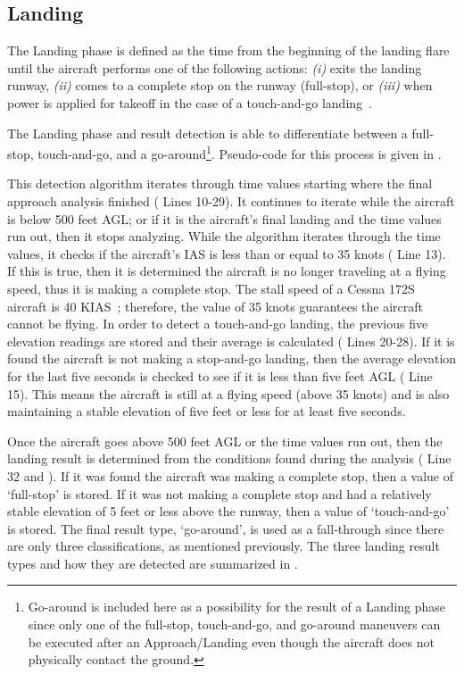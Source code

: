         
    
    \subsection{Landing}
    
    The Landing phase is defined as the time from the beginning of the landing flare until the aircraft performs one of the following actions: \textit{(i)} exits the landing runway, \textit{(ii)} comes to a complete stop on the runway (full-stop), or \textit{(iii)} when power is applied for takeoff in the case of a touch-and-go landing~\cite{cictt2013phase}.
    
    The Landing phase and result detection is able to differentiate between a full-stop, touch-and-go, and a go-around\footnote{Go-around is included here as a possibility for the result of a Landing phase since only one of the full-stop, touch-and-go, and go-around maneuvers can be executed after an Approach/Landing even though the aircraft does not physically contact the ground.}.  Pseudo-code for this process is given in .
    
    This detection algorithm iterates through time values starting where the final approach analysis finished ( Lines 10-29).  It continues to iterate while the aircraft is below 500 feet AGL; or if it is the aircraft's final landing and the time values run out, then it stops analyzing.  While the algorithm iterates through the time values, it checks if the aircraft's IAS is less than or equal to 35 knots ( Line 13).  If this is true, then it is determined the aircraft is no longer traveling at a flying speed, thus it is making a complete stop.  The stall speed of a Cessna 172S aircraft is 40 KIAS~\cite{und_poh}; therefore, the value of 35 knots guarantees the aircraft cannot be flying.  In order to detect a touch-and-go landing, the previous five elevation readings are stored and their average is calculated ( Lines 20-28).  If it is found the aircraft is not making a stop-and-go landing, then the average elevation for the last five seconds is checked to see if it is less than five feet AGL ( Line 15).  This means the aircraft is still at a flying speed (above 35 knots) and is also maintaining a stable elevation of five feet or less for at least five seconds.
    
    Once the aircraft goes above 500 feet AGL or the time values run out, then the landing result is determined from the conditions found during the analysis ( Line 32 and ).  If it was found the aircraft was making a complete stop, then a value of `full-stop' is stored.  If it was not making a complete stop and had a relatively stable elevation of 5 feet or less above the runway, then a value of `touch-and-go' is stored.  The final result type, `go-around', is used as a fall-through since there are only three classifications, as mentioned previously.  The three landing result types and how they are detected are summarized in .
    
